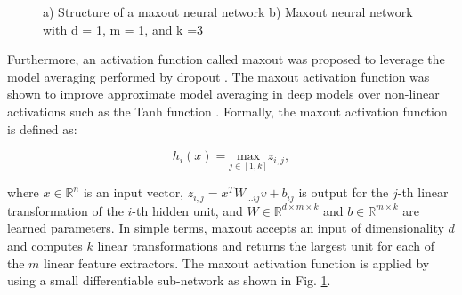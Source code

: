 \begin{figure}[htb]
    \centering
    \hfill
        
    \caption{a) Structure of a maxout neural network b) Maxout neural network with d = 1, m = 1, and k =3}\label{fig:maxout}
\end{figure}

Furthermore, an activation function called maxout was proposed to leverage the model averaging performed by dropout \cite{goodfellow2013maxout}. The maxout activation function was shown to improve approximate model averaging in deep models over non-linear activations such as the Tanh function \cite{goodfellow2013maxout}. Formally, the maxout activation function is defined as: 

\begin{equation} \label{eq:maxout}
    h_{i}(x) = \underset{j \in [1,k]}{\mathrm{max}}z_{i,j},
\end{equation}

\noindent
where $x \in \mathbb{R}^{n}$ is an input vector, $z_{i,j} = x^{T}W_{...ij}v + b_{ij}$ is output for the $j$-th linear transformation of the $i$-th hidden unit, and $W \in \mathbb{R}^{d \times m \times k}$ and $b \in \mathbb{R}^{m \times k}$ are learned parameters. In simple terms, maxout accepts an input of dimensionality $d$ and computes $k$ linear transformations and returns the largest unit for each of the $m$ linear feature extractors. The maxout activation function is applied by using a small differentiable sub-network as shown in Fig. \ref{fig:maxout}.

